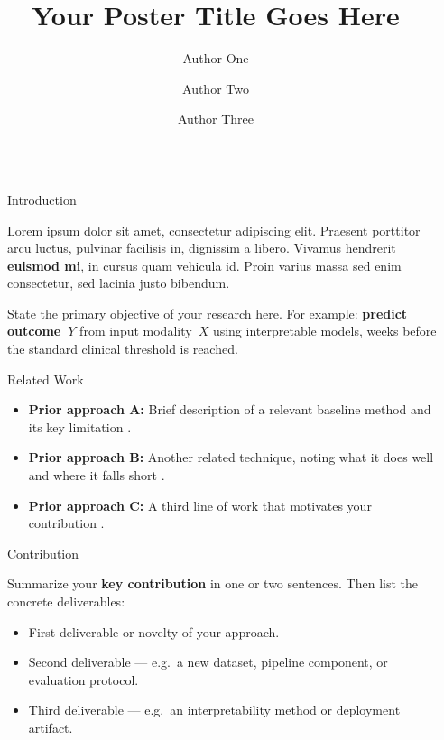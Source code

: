 \documentclass[final]{beamer}
\title{Your Poster Title Goes Here}
\author{Author One \and Author Two \and Author Three}
\institute[shortinst]{Department of Your Department, University of Placeholder}
\newlength{\sepwidth}
\newlength{\colwidth}
\newcommand{\separatorcolumn}{\begin{column}{\sepwidth}\end{column}}
\begin{document}
\begin{frame}[t]
\begin{columns}[t]
\separatorcolumn

\begin{column}{\colwidth}

  \begin{block}{Introduction}

    Lorem ipsum dolor sit amet, consectetur adipiscing elit. Praesent
    porttitor arcu luctus, pulvinar facilisis in, dignissim a libero.
    Vivamus hendrerit \textbf{euismod mi}, in cursus quam vehicula id.
    Proin varius massa sed enim consectetur, sed lacinia justo
    bibendum.


    State the primary objective of your research here.  For example:
    \textbf{predict outcome~$Y$} from input modality~$X$ using
    interpretable models, weeks before the standard clinical threshold
    is reached.

  \end{block}

  \begin{block}{Related Work}

    \begin{itemize}
      \item \textbf{Prior approach A:} Brief description of a
        relevant baseline method and its key limitation
        \cite{smith2023method}.
      \item \textbf{Prior approach B:} Another related technique,
        noting what it does well and where it falls short
        \cite{jones2024analysis}.
      \item \textbf{Prior approach C:} A third line of work that
        motivates your contribution
        \cite{doe2022framework}.
    \end{itemize}

  \end{block}

  \begin{alertblock}{Contribution}

    Summarize your \textbf{key contribution} in one or two sentences.
    Then list the concrete deliverables:

    \begin{itemize}
      \item First deliverable or novelty of your approach.
      \item Second deliverable --- e.g.\ a new dataset, pipeline
        component, or evaluation protocol.
      \item Third deliverable --- e.g.\ an interpretability method
        or deployment artifact.
    \end{itemize}


\end{alertblock}
\end{column}
\end{columns}
\end{frame}
\end{document}
